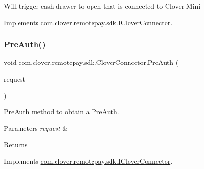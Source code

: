 Will trigger cash drawer to open that is connected to Clover Mini 



Implements \hyperlink{interfacecom_1_1clover_1_1remotepay_1_1sdk_1_1_i_clover_connector_a0fc361c449dc63eab061ca6866124deb}{com.\+clover.\+remotepay.\+sdk.\+I\+Clover\+Connector}.

\mbox{\label{classcom_1_1clover_1_1remotepay_1_1sdk_1_1_clover_connector_ab770dbea796bfc3ffa1d0ed999d04b48}} 
\subsubsection{\texorpdfstring{Pre\+Auth()}{PreAuth()}}
{\footnotesize\ttfamily void com.\+clover.\+remotepay.\+sdk.\+Clover\+Connector.\+Pre\+Auth (\begin{DoxyParamCaption}\item[{\hyperlink{classcom_1_1clover_1_1remotepay_1_1sdk_1_1_pre_auth_request}{Pre\+Auth\+Request}}]{request }\end{DoxyParamCaption})}



Pre\+Auth method to obtain a Pre\+Auth. 


\begin{DoxyParams}{Parameters}
{\em request} & \\
\hline
\end{DoxyParams}
\begin{DoxyReturn}{Returns}

\end{DoxyReturn}


Implements \hyperlink{interfacecom_1_1clover_1_1remotepay_1_1sdk_1_1_i_clover_connector_aa41978ea2b8048ff23ab931752129eb9}{com.\+clover.\+remotepay.\+sdk.\+I\+Clover\+Connector}.

\mbox{\label{classcom_1_1clover_1_1remotepay_1_1sdk_1_1_clover_connector_a4743d4155d22ddc978602814cb72ee6b}} 
